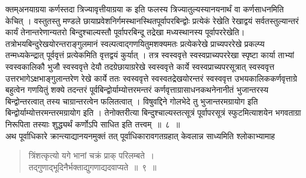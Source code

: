 \documentclass[11pt, openany]{book}
\begin{document}
\begin{sloppypar}
\noindent क्तम्\textendash अनयाग्रया कर्णस्तदा त्रिज्यावृत्तीयाग्रया क इति फलस्य त्रिज्यातुल्यस्यानयनार्थं वा कर्णसाधनमिति केचित् । वस्तुतस्तु मण्डले छायाप्रवेशनिर्गमस्थानस्थितपूर्वापरबिन्द्वोः प्रत्येकं रेखेति रेखाद्वयं सर्वतस्तुल्यान्तरं कार्यं तेनान्तरेणान्यतरो बिन्दुश्चाल्यस्तौ पूर्वापरबिन्दू तद्रेखा मध्यस्थानस्य पूर्वापररेखेति।तत्रोभयबिन्दुरेखयोरन्तराङ्गुलमानं स्वल्पत्वाद्गणयितुमशक्यमतः प्रत्येकरेखे प्राच्यपररेखे प्रकल्प्य तन्मध्यकेन्द्रात् पूर्ववृत्तं प्रत्येकमिति वृत्तद्वयं कुर्यात् । तत्र स्वस्ववृत्ते स्वस्वप्राच्यपररेखा स्पृष्टा कार्या ताभ्यां स्वस्वकालिकौ भुजौ स्वस्ववृत्ते देयौ तदग्रेछायाग्ररेखे स्वस्ववृत्ते कार्ये स्वस्वप्राच्यपरसूत्रात् स्वस्ववृत्त उत्तरभागेऽक्षभाङ्गुलान्तरेण रेखे कार्ये ततः स्वस्ववृत्ते स्वस्वतद्रेखयोरन्तरं स्वस्ववृत्त उभयकालिककर्णवृत्ताग्रे बहुत्वेन गणयितुं शक्ये तदन्तरं पूर्वबिन्द्वोर्याम्योत्तरमन्तरं कर्णवृत्ताग्रासाधनकथनेनानीतं भुजान्तरस्य बिन्द्वोन्तरत्वात् तस्य चाग्रान्तरत्वेन फलितत्वात् । विषुवद्दिने गोलभेदे तु भुजान्तरमग्रायोग इति बिन्द्वोर्याम्योत्तरमन्तरमग्रायोग इति । तेनोक्तरीत्या बिन्दुश्चाल्यस्तत्सूत्रं पूर्वापरसूत्रं स्फुटमित्याशयेन भगवताग्रा निरूपिता तस्याः शुद्ध्यर्थं कर्णोऽपि साधित इति तत्त्वम्~॥~८~॥\\
\noindent अथ पूर्वाधिकारे क्रान्त्याद्यानयनमुक्तं तत् पूर्वाधिकारावगतग्रहात् केवलान्न साध्यमिति श्लोकाभ्यामाह\textendash
\end{sloppypar}
\begin{quote}

  {\ssi त्रिंशत्कृत्यो यगे भानां चक्रं प्राक् परिलम्बते~।\\
तद्गुणाद्भूदिनैर्भक्ताद्युगणाद्यदवाप्यते~॥~९~॥}
\end{quote}

\newpage
\end{document}
